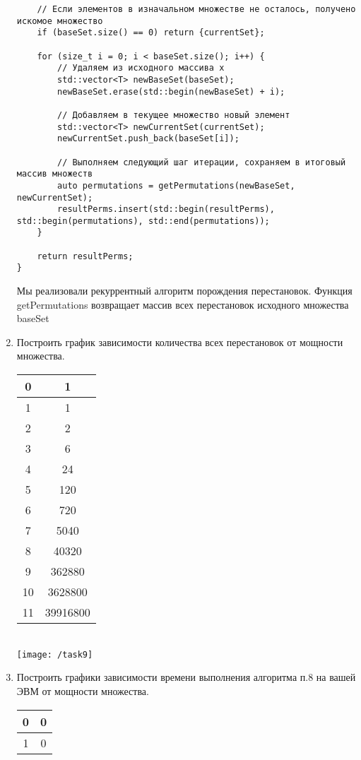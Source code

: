 \documentclass[a4paper,14pt]{extarticle}
\begin{document}
\begin{enumerate}[№1. ]
\begin{verbatim}
	// Если элементов в изначальном множестве не осталось, получено искомое множество
	if (baseSet.size() == 0) return {currentSet};
	
	for (size_t i = 0; i < baseSet.size(); i++) {
		// Удаляем из исходного массива x
		std::vector<T> newBaseSet(baseSet);
		newBaseSet.erase(std::begin(newBaseSet) + i);
		
		// Добавляем в текущее множество новый элемент
		std::vector<T> newCurrentSet(currentSet);
		newCurrentSet.push_back(baseSet[i]);
		
		// Выполняем следующий шаг итерации, сохраняем в итоговый массив множеств
		auto permutations = getPermutations(newBaseSet, newCurrentSet);
		resultPerms.insert(std::begin(resultPerms), std::begin(permutations), std::end(permutations));
	}
	
	return resultPerms;
}
\end{verbatim}
Мы реализовали рекуррентный алгоритм порождения перестановок. Функция getPermutations возвращает массив всех перестановок исходного множества baseSet
\item Построить график зависимости количества всех перестановок от мощности множества.\bigbreak
\begin{center}
\begin{tabular}{ cc} 
	\hline
	0&1\\
	\hline
	1&1\\
	\hline
	2&2\\
	\hline
	3&6\\
	\hline
	4&24\\
	\hline
	5&120\\
	\hline
	6&720\\
	\hline
	7&5040\\
	\hline
	8&40320\\
	\hline
	9&362880\\
	\hline
	10&3628800\\
	\hline
	11&39916800\\
	\hline
\end{tabular}\\
\texttt{[image: /task9]}\\
\end{center}
\item Построить графики зависимости времени выполнения алгоритма п.8 на вашей ЭВМ от мощности множества.\bigbreak
\begin{center}
	\begin{tabular}{ cc} 
		\hline
		0&0\\
		\hline
		1&0\\

\end{tabular}
\end{center}
\end{enumerate}
\end{document}
